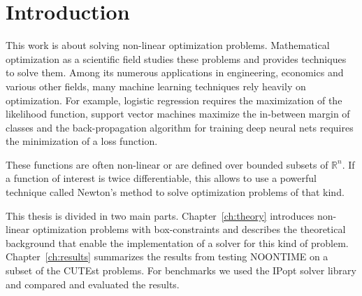 \chapter{Introduction}
This work is about solving non-linear optimization problems.
Mathematical optimization as a scientific field studies these problems and provides techniques to solve them. Among its numerous applications in engineering, economics and various other fields, many machine learning techniques rely heavily on optimization. For example, logistic regression requires the maximization of the likelihood function, support vector machines maximize the in-between margin of classes and the back-propagation algorithm for training deep neural nets requires the minimization of a loss function.

These functions are often non-linear or are defined over bounded subsets of $\mathbb{R}^n$.
If a function of interest is twice differentiable, this allows to use a powerful technique called Newton's method to solve optimization problems of that kind. 

This thesis is divided in two main parts. Chapter~\ref{ch:theory} introduces non-linear optimization problems with box-constraints and describes the theoretical background that enable the implementation of a solver for this kind of problem.
Chapter~\ref{ch:results} summarizes the results from testing NOONTIME on a subset of the CUTEst problems. For benchmarks we used the IPopt solver library and compared and evaluated the results.